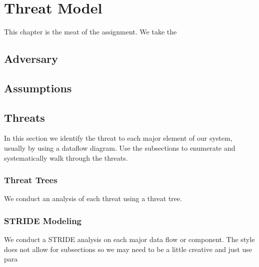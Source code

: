 \chapter{Threat Model}
\label{ch:threatmodel}
This chapter is the meat of the assignment.  We take the


\section{Adversary}
\label{sec:adversary}

\section{Assumptions}
\label{sec:assumptions}

\section{Threats}
\label{sec:threats}
In this section we identify the threat to each major element of our system, usually by using a dataflow diagram.  Use the subsections to enumerate and systematically walk through the threats.
\subsection{Threat Trees}
We conduct an analysis of each threat using a threat tree.

\subsection{STRIDE Modeling}
We conduct a STRIDE analysis on each major data flow or component.  The style does not allow for subsections so we may need to be a little creative and just use para
